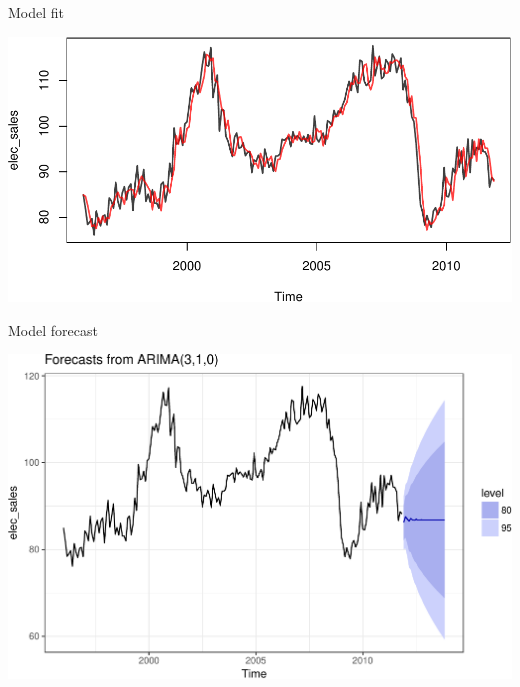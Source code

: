 \documentclass[11pt,ignorenonframetext,]{beamer}
\newenvironment{Shaded}{}{}
\newcommand{\DataTypeTok}[1]{\textcolor[rgb]{0.56,0.13,0.00}{#1}}
\newcommand{\DecValTok}[1]{\textcolor[rgb]{0.25,0.63,0.44}{#1}}
\newcommand{\KeywordTok}[1]{\textcolor[rgb]{0.00,0.44,0.13}{\textbf{#1}}}
\newcommand{\NormalTok}[1]{#1}
\newcommand{\OperatorTok}[1]{\textcolor[rgb]{0.40,0.40,0.40}{#1}}
\newcommand{\StringTok}[1]{\textcolor[rgb]{0.25,0.44,0.63}{#1}}
\let\oldShaded\Shaded
\let\endoldShaded\endShaded
\renewenvironment{Shaded}{\footnotesize\begin{spacing}{0.9}\oldShaded}{\endoldShaded\end{spacing}}
\begin{document}
\begin{frame}{%
\protect\hypertarget{model-fit}{%
Model fit}}

\begin{center}\includegraphics[width=\textwidth]{Lec09_files/figure-beamer/unnamed-chunk-30-1} \end{center}

\end{frame}

\begin{frame}[fragile]{%
\protect\hypertarget{model-forecast}{%
Model forecast}}

\begin{Shaded}
\end{Shaded}

\begin{center}\includegraphics[width=\textwidth]{Lec09_files/figure-beamer/unnamed-chunk-31-1} \end{center}

\end{frame}
\end{document}
